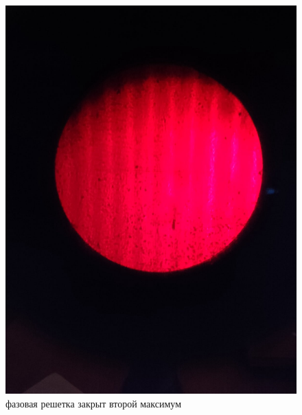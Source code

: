 \begin{figure}[h!]
\begin{center}
\begin{minipage}[h!]{0.48\linewidth}
				\includegraphics[width=1\linewidth]{./images/фазовая_решетка_закрыт_второй_максимум}
				\caption{фазовая решетка закрыт второй максимум}
				\label{3}
			\end{minipage}
		\end{center}
	\end{figure}

